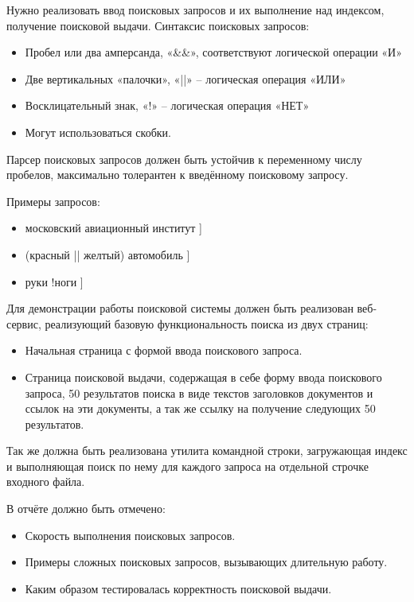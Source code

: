 
Нужно реализовать ввод поисковых запросов и их выполнение над индексом, получение
поисковой выдачи.
Синтаксис поисковых запросов:
\begin{itemize}
    \item Пробел или два амперсанда, «\&\&», соответствуют логической операции «И»
    \item Две вертикальных «палочки», «||» – логическая операция «ИЛИ»
    \item Восклицательный знак, «!» – логическая операция «НЕТ»
    \item Могут использоваться скобки.
\end{itemize}

Парсер поисковых запросов должен быть устойчив к переменному числу пробелов, максимально
толерантен к введённому поисковому запросу.

Примеры запросов:
\begin{itemize}
    \item \text{[} московский авиационный институт ]
    \item \text{[} (красный || желтый) автомобиль ]
    \item \text{[} руки !ноги ]
\end{itemize}

Для демонстрации работы поисковой системы должен быть реализован веб-сервис, реализующий
базовую функциональность поиска из двух страниц:
\begin{itemize}
    \item Начальная страница с формой ввода поискового запроса.
    \item Страница поисковой выдачи, содержащая в себе форму ввода поискового запроса, 50 результатов поиска в виде текстов заголовков документов и ссылок на эти документы, а так же ссылку на получение следующих 50 результатов.
\end{itemize}

Так же должна быть реализована утилита командной строки, загружающая индекс и
выполняющая поиск по нему для каждого запроса на отдельной строчке входного файла.

В отчёте должно быть отмечено:
\begin{itemize}
    \item Скорость выполнения поисковых запросов.
    \item Примеры сложных поисковых запросов, вызывающих длительную работу.
    \item Каким образом тестировалась корректность поисковой выдачи.
\end{itemize}

\pagebreak
